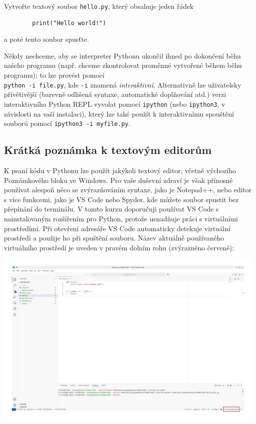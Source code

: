 \begin{exercise}
    Vytvořte textový soubor \verb|hello.py|, který obsahuje jeden řádek
    \begin{lstlisting}
        print("Hello world!")
    \end{lstlisting}
    a poté tento soubor spusťte.
\end{exercise}

Někdy nechceme, aby se interpreter Pythonu ukončil ihned po dokončení běhu našeho programu (např. chceme zkontrolovat proměnné vytvořené během běhu programu); to lze provést pomocí\\ \verb|python -i file.py|, kde \verb|-i| znamená \emph{interaktivní}. Alternativně lze uživatelsky přívětivější (barevně odlišená syntaxe, automatické doplňování atd.) verzi interaktivního Python REPL vyvolat pomocí \verb|ipython| (nebo \verb|ipython3|, v závislosti na vaší instalaci), který lze také použít k interaktivnímu spouštění souborů pomocí \verb|ipython3 -i myfile.py|.

\subsection{Krátká poznámka k textovým editorům}
K psaní kódu v Pythonu lze použít jakýkoli textový editor, včetně výchozího Poznámkového bloku ve Windows. Pro vaše duševní zdraví je však přínosné používat alespoň něco se zvýrazňováním syntaxe, jako je Notepad++, nebo editor s více funkcemi, jako je VS Code nebo Spyder, kde můžete soubor spustit bez přepínání do terminálu. V tomto kurzu doporučuji používat VS Code s nainstalovaným rozšířením pro Python, protože usnadňuje práci s virtuálními prostředími. Při otevření adresáře VS Code automaticky detekuje virtuální prostředí a použije ho při spuštění souboru. Název aktuálně používaného virtuálního prostředí je uveden v pravém dolním rohu (zvýrazněno červeně):
\begin{center}
    \includegraphics[width=0.9\linewidth]{vscode.png}
\end{center}

